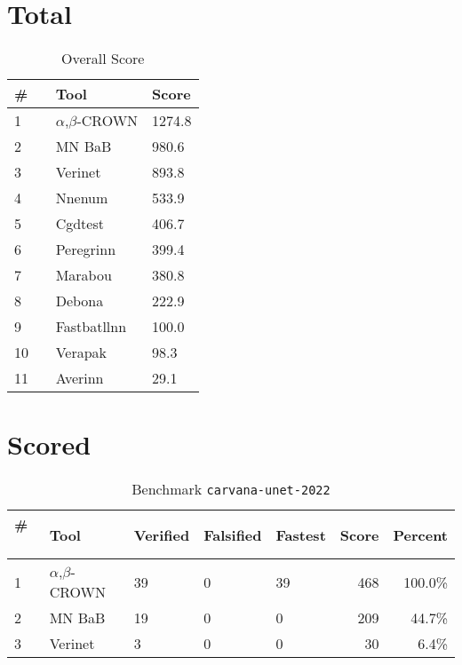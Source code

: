 
\section{Total}


\begin{table}[h]
\begin{center}
\caption{Overall Score} \label{tab:score}
{\setlength{\tabcolsep}{2pt}
\begin{tabular}[h]{@{}lll@{}}
\toprule
\textbf{\# ~} & \textbf{Tool} & \textbf{Score}\\
\midrule
1 & $\alpha$,$\beta$-CROWN & 1274.8 \\
2 & MN BaB & 980.6 \\
3 & Verinet & 893.8 \\
4 & Nnenum & 533.9 \\
5 & Cgdtest & 406.7 \\
6 & Peregrinn & 399.4 \\
7 & Marabou & 380.8 \\
8 & Debona & 222.9 \\
9 & Fastbatllnn & 100.0 \\
10 & Verapak & 98.3 \\
11 & Averinn & 29.1 \\
\bottomrule
\end{tabular}
}
\end{center}
\end{table}

\clearpage
\section{Scored}

\begin{table}[h]
\begin{center}
\caption{Benchmark \texttt{carvana-unet-2022}} \label{tab:cat_{cat}}
{\setlength{\tabcolsep}{2pt}
\begin{tabular}[h]{@{}lllllrr@{}}
\toprule
\textbf{\# ~} & \textbf{Tool} & \textbf{Verified} & \textbf{Falsified} & \textbf{Fastest} & \textbf{Score} & \textbf{Percent}\\
\midrule
1 & $\alpha$,$\beta$-CROWN & 39 & 0 & 39 & 468 & 100.0\% \\
2 & MN BaB & 19 & 0 & 0 & 209 & 44.7\% \\
3 & Verinet & 3 & 0 & 0 & 30 & 6.4\% \\
\bottomrule
\end{tabular}
}
\end{center}
\end{table}



